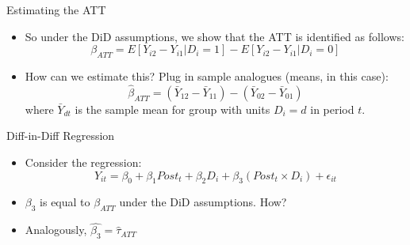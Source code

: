 \documentclass[11pt,notes=hide,aspectratio=169,mathserif]{beamer}
\begin{document}
\begin{frame}{Estimating the ATT}
\begin{itemize}
  \item So under the DiD assumptions, we show that the ATT is identified as follows:
  \begin{equation*}
    \beta_{ATT} = E[Y_{i2} - Y_{i1} | D_i = 1] - E[Y_{i2} - Y_{i1} | D_i = 0]
  \end{equation*}
  \item How can we estimate this? \pause Plug in sample analogues (means, in this case):
  \begin{equation*}
    \hat{\beta}_{ATT} = (\bar{Y}_{12} - \bar{Y}_{11}) - (\bar{Y}_{02} - \bar{Y}_{01})
  \end{equation*}
    where $\bar{Y}_{dt}$ is the sample mean for group with units $D_i=d$ in period $t$.
\end{itemize}
\end{frame}


\begin{frame}{Diff-in-Diff Regression}
\begin{itemize}
  \item Consider the regression:
  \begin{equation*}
    Y_{it} = \beta_0 + \beta_1 Post_t + \beta_2 D_i + \beta_{3} (Post_t \times D_i) + \epsilon_{it}
  \end{equation*}
\item $\beta_3$ is equal to $\beta_{ATT}$ under the DiD assumptions. How?
\item Analogously, $\hat{\beta_3} = \hat{\tau}_{ATT}$
\end{itemize}
\end{frame}
\end{document}
